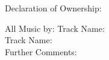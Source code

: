 

Declaration of Ownership:
\newline

All Music by: \newline
Track Name: \\
Track Name: \\
Further Comments: \\
\clearpage
